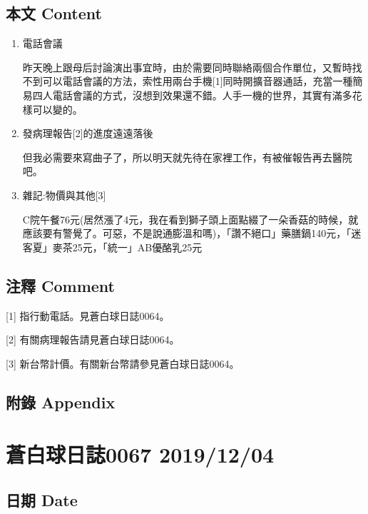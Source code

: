\documentclass[a5paper, 12pt
]{book}
\begin{document}
\hypertarget{ux672cux6587-content-2}{%
\subsection{本文 Content}\label{ux672cux6587-content-2}}

\begin{enumerate}
\def\labelenumi{\arabic{enumi}.}
\item
  電話會議

  昨天晚上跟母后討論演出事宜時，由於需要同時聯絡兩個合作單位，又暫時找不到可以電話會議的方法，索性用兩台手機{[}1{]}同時開擴音器通話，充當一種簡易四人電話會議的方式，沒想到效果還不錯。人手一機的世界，其實有滿多花樣可以變的。
\item
  發病理報告{[}2{]}的進度遠遠落後

  但我必需要來寫曲子了，所以明天就先待在家裡工作，有被催報告再去醫院吧。
\item
  雜記:物價與其他{[}3{]}

  C院午餐76元(居然漲了4元，我在看到獅子頭上面點綴了一朵香菇的時候，就應該要有警覺了。可惡，不是說通膨溫和嗎)，「讚不絕口」藥膳鍋140元，「迷客夏」麥茶25元，「統一」AB優酪乳25元
\end{enumerate}

\hypertarget{ux6ce8ux91cb-comment-2}{%
\subsection{注釋 Comment}\label{ux6ce8ux91cb-comment-2}}

{[}1{]} 指行動電話。見蒼白球日誌0064。

{[}2{]} 有關病理報告請見蒼白球日誌0064。

{[}3{]} 新台幣計價。有關新台幣請參見蒼白球日誌0064。

\hypertarget{ux9644ux9304-appendix-2}{%
\subsection{附錄 Appendix}\label{ux9644ux9304-appendix-2}}

\hypertarget{ux84bcux767dux7403ux65e5ux8a8c0067-20191204}{%
\section{蒼白球日誌0067
2019/12/04}\label{ux84bcux767dux7403ux65e5ux8a8c0067-20191204}}

\hypertarget{ux65e5ux671f-date-3}{%
\subsection{日期 Date}\label{ux65e5ux671f-date-3}}
\end{document}

